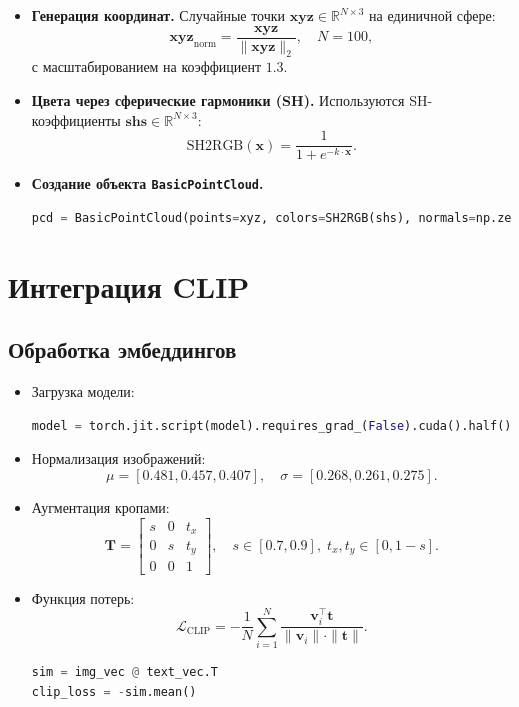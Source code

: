 \begin{itemize}
    \item \textbf{Генерация координат.} Случайные точки $\mathbf{xyz} \in \mathbb{R}^{N \times 3}$ на единичной сфере:
    \[
        \mathbf{xyz}_{\text{norm}} = \frac{\mathbf{xyz}}{\|\mathbf{xyz}\|_2}, \quad N = 100,
    \]
    с масштабированием на коэффициент $1.3$.

    \item \textbf{Цвета через сферические гармоники (SH).} Используются SH-коэффициенты $\mathbf{shs} \in \mathbb{R}^{N \times 3}$:
    \[
        \text{SH2RGB}(\mathbf{x}) = \frac{1}{1 + e^{-k \cdot \mathbf{x}}}.
    \]

    \item \textbf{Создание объекта \texttt{BasicPointCloud}.}
    \begin{lstlisting}[language=Python]
pcd = BasicPointCloud(points=xyz, colors=SH2RGB(shs), normals=np.zeros((num_pts, 3)))
    \end{lstlisting}
\end{itemize}

\section{Интеграция CLIP}

\subsection{Обработка эмбеддингов}

\begin{itemize}
    \item Загрузка модели:
    \begin{lstlisting}[language=Python]
model = torch.jit.script(model).requires_grad_(False).cuda().half()
    \end{lstlisting}

    \item Нормализация изображений:
    \[
        \mu = [0.481, 0.457, 0.407], \quad \sigma = [0.268, 0.261, 0.275].
    \]

    \item Аугментация кропами:
    \[
        \mathbf{T} = \begin{bmatrix}
            s & 0 & t_x \\
            0 & s & t_y \\
            0 & 0 & 1
        \end{bmatrix}, \quad s \in [0.7, 0.9], \; t_x, t_y \in [0, 1 - s].
    \]

    \item Функция потерь:
    \[
        \mathcal{L}_{\text{CLIP}} = -\frac{1}{N} \sum_{i=1}^{N} \frac{\mathbf{v}_i^\top \mathbf{t}}{\|\mathbf{v}_i\| \cdot \|\mathbf{t}\|}.
    \]
    \begin{lstlisting}[language=Python]
sim = img_vec @ text_vec.T
clip_loss = -sim.mean()
    \end{lstlisting}
\end{itemize}

